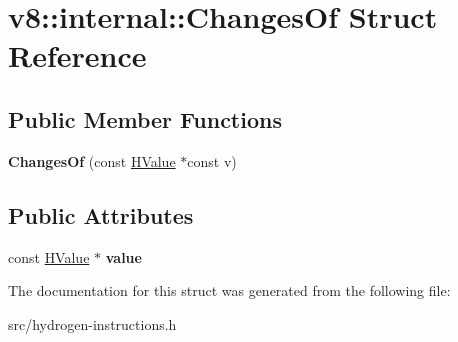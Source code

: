 \hypertarget{structv8_1_1internal_1_1_changes_of}{}\section{v8\+:\+:internal\+:\+:Changes\+Of Struct Reference}
\label{structv8_1_1internal_1_1_changes_of}
\subsection*{Public Member Functions}
\begin{DoxyCompactItemize}
\item 
\hypertarget{structv8_1_1internal_1_1_changes_of_aa1c661bbd92bcabc8d6185d51ec2d776}{}{\bfseries Changes\+Of} (const \hyperlink{classv8_1_1internal_1_1_h_value}{H\+Value} $\ast$const v)\label{structv8_1_1internal_1_1_changes_of_aa1c661bbd92bcabc8d6185d51ec2d776}

\end{DoxyCompactItemize}
\subsection*{Public Attributes}
\begin{DoxyCompactItemize}
\item 
\hypertarget{structv8_1_1internal_1_1_changes_of_a89b2136ab2622bb87d43e26b86da0d10}{}const \hyperlink{classv8_1_1internal_1_1_h_value}{H\+Value} $\ast$ {\bfseries value}\label{structv8_1_1internal_1_1_changes_of_a89b2136ab2622bb87d43e26b86da0d10}

\end{DoxyCompactItemize}


The documentation for this struct was generated from the following file\+:\begin{DoxyCompactItemize}
\item 
src/hydrogen-\/instructions.\+h\end{DoxyCompactItemize}
